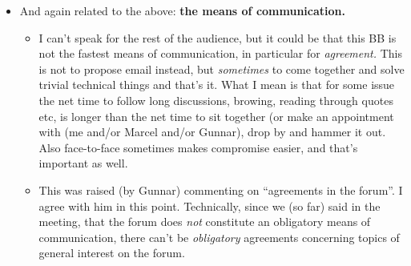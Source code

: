 \documentclass[11pt,handout,nologo]{handout}
\begin{document}
\begin{itemize}
\begin{itemize}
\begin{itemize}
    The counter argument, ``perhaps the previous specs had been some open
    points too, but at least \emph{we} had to implement it'' does not
    really hold in my eyes, because we \emph{all} have to implement it, not
    just each one his own spec. Life would indeed be easier if each group
    could implement whatever it chooses (spec 1, or spec 2, or some
    additions/subset), but that's not the idea.
  \item Related to the above concern (``general development, apart from
    technical details'') I further agree with Sandro (if that was his point):
    No unannouced critical changes which influences someone else. This holds
    even for \emph{healthy} changes.\footnote{Unless one really trusts each
      other.} 
  \end{itemize}
\item And again related to the above: \textbf{the means of communication.}
    \begin{itemize}
    \item I can't speak for the rest of the audience, but it could be that
      this BB is not the fastest means of communication, in particular for
      \emph{agreement.} This is not to propose email instead, but
      \emph{sometimes} to come together and solve trivial technical things
      and that's it. What I mean is that for some issue the net time to
      follow long discussions, browing, reading through quotes etc, is
      longer than the net time to sit together (or make an appointment with
      (me and/or Marcel and/or Gunnar), drop by and hammer it out. Also
      face-to-face sometimes makes compromise easier, and that's important
      as well.
    \item This was raised (by Gunnar) commenting on ``agreements in the
      forum''. I agree with him in this point. Technically, since we (so far)
      said in the meeting, that the forum does \emph{not} constitute an
      obligatory means of communication, there can't be \emph{obligatory}
      agreements concerning topics of general interest on the forum.
      

\end{itemize}
\end{itemize}
\end{itemize}
\end{document}

